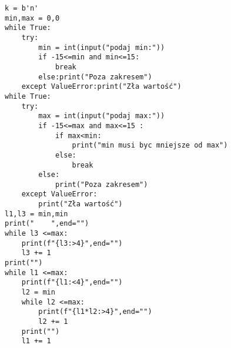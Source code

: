 \begin{verbatim}
k = b'n'
min,max = 0,0
while True:
    try:
        min = int(input("podaj min:"))
        if -15<=min and min<=15:
            break
        else:print("Poza zakresem")
    except ValueError:print("Zła wartość")
while True:
    try:
        max = int(input("podaj max:"))
        if -15<=max and max<=15 :
            if max<min:
                print("min musi byc mniejsze od max")
            else:
                break
        else:
            print("Poza zakresem")
    except ValueError:
        print("Zła wartość")
l1,l3 = min,min
print("    ",end="")
while l3 <=max:
    print(f"{l3:>4}",end="")
    l3 += 1
print("")
while l1 <=max:
    print(f"{l1:<4}",end="")
    l2 = min
    while l2 <=max:
        print(f"{l1*l2:>4}",end="")
        l2 += 1
    print("")
    l1 += 1
\end{verbatim}
